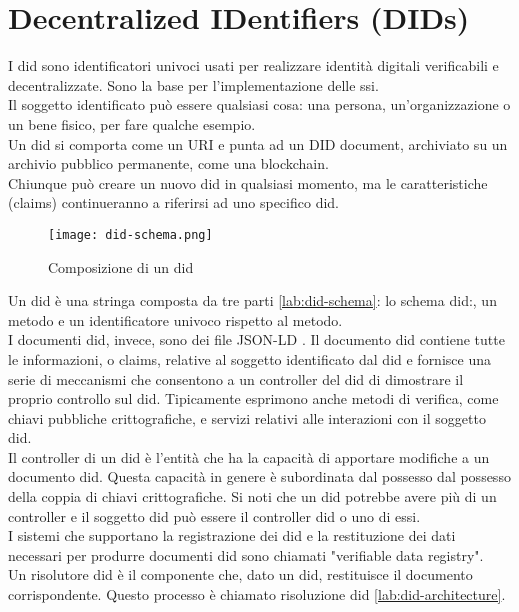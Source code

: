 \section{Decentralized IDentifiers (DIDs)}
I \gls{did} sono identificatori univoci usati per realizzare identità digitali verificabili e decentralizzate. Sono la base per l'implementazione delle \gls{ssi}. \\
Il soggetto identificato può essere qualsiasi cosa: una persona, un'organizzazione o un bene fisico, per fare qualche esempio. \\
Un \gls{did} si comporta come un URI e punta ad un DID document, archiviato su un archivio pubblico permanente, come una blockchain. \\
Chiunque può creare un nuovo \gls{did} in qualsiasi momento, ma le caratteristiche (claims) continueranno a riferirsi ad uno specifico \gls{did}. \\

\begin{figure}[h]
    \texttt{[image: did-schema.png]}
    \centering
    \caption{Composizione di un \gls{did} \cite{img:did-schema}}
    \label{lab:did-schema}
\end{figure}

Un \gls{did} è una stringa composta da tre parti \autoref{lab:did-schema}: lo schema \gls{did}:, un metodo e un identificatore univoco rispetto al metodo. \cite{wiki:did} \\
I documenti \gls{did}, invece, sono dei file JSON-LD \cite{wiki:json-ld}. Il documento \gls{did} contiene tutte le informazioni, o claims, 
relative al soggetto identificato dal \gls{did} e fornisce una serie di meccanismi che consentono a un controller del \gls{did} di dimostrare il proprio controllo sul \gls{did}. 
Tipicamente esprimono anche metodi di verifica, come chiavi pubbliche crittografiche, e servizi relativi alle interazioni con il soggetto \gls{did}. \\

Il controller di un \gls{did} è l'entità che ha la capacità di apportare modifiche a un documento \gls{did}. Questa capacità in genere è subordinata dal possesso dal possesso della coppia di chiavi crittografiche. 
Si noti che un \gls{did} potrebbe avere più di un controller e il soggetto \gls{did} può essere il controller \gls{did} o uno di essi. \\

I sistemi che supportano la registrazione dei \gls{did} e la restituzione dei dati necessari per produrre documenti \gls{did} sono chiamati "verifiable data registry". \\
Un risolutore \gls{did} è il componente che, dato un \gls{did}, restituisce il documento corrispondente. Questo processo è chiamato risoluzione \gls{did} \autoref{lab:did-architecture}.

